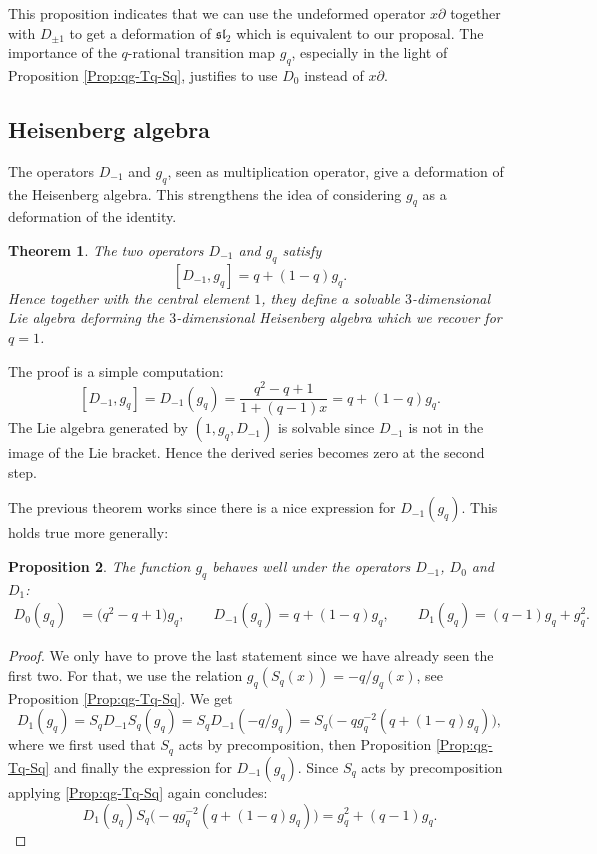 \documentclass[10pt,a4paper]{amsart}
\numberwithin{equation}{section}
\newtheorem{Theorem}{Theorem}[section]
\newtheorem{Proposition}[Theorem]{Proposition}
 { \theoremstyle{definition}
\newtheorem{Definition}[Theorem]{Definition}
\newtheorem{Note}[Theorem]{Note}
\newtheorem{Example}[Theorem]{Example}
\newtheorem{Remark}[Theorem]{Remark} }
\begin{document}
This proposition indicates that we can use the undeformed operator $x\partial$ together with $D_{\pm 1}$ to get a deformation of $\mathfrak{sl}_2$ which is equivalent to our proposal. The importance of the $q$-rational transition map $g_q$, especially in the light of Proposition \ref{Prop:qg-Tq-Sq}, justifies to use $D_0$ instead of $x\partial$.


\subsection{Heisenberg algebra}
The operators $D_{-1}$ and $g_q$, seen as multiplication operator, give a deformation of the Heisenberg algebra. This strengthens the idea of considering $g_q$ as a deformation of the identity.

\begin{Theorem}
The two operators $D_{-1}$ and $g_q$ satisfy
\[
[D_{-1},g_q]=q+(1-q)g_q.
\]
Hence together with the central element $1$, they define a solvable $3$-dimensional Lie algebra deforming the $3$-dimensional Heisenberg algebra which we recover for $q=1$.
\end{Theorem}

The proof is a simple computation:
\[[D_{-1},g_q]=D_{-1}(g_q)=\frac{q^2-q+1}{1+(q-1)x}=q+(1-q)g_q.
\]
The Lie algebra generated by $(1,g_q,D_{-1})$ is solvable since $D_{-1}$ is not in the image of the Lie bracket. Hence the derived series becomes zero at the second step.

The previous theorem works since there is a nice expression for $D_{-1}(g_q)$. This holds true more generally:
\begin{Proposition}\label{Prop:op-diff-gq}
The function $g_q$ behaves well under the operators $D_{-1}$, $D_0$ and $D_1$:
\begin{align*}
D_0(g_q) &= \big(q^2-q+1\big)g_q, \qquad
D_{-1}(g_q) = q+(1-q)g_q, \qquad
D_1(g_q) = (q-1)g_q+g_q^2.
\end{align*}
\end{Proposition}
\begin{proof}
We only have to prove the last statement since we have already seen the first two. For that, we use the relation $g_q(S_q(x))=-q/g_q(x)$, see Proposition \ref{Prop:qg-Tq-Sq}. We get
\[
D_1(g_q)=S_qD_{-1}S_q(g_q)=S_qD_{-1}(-q/g_q)=S_q\bigl(-qg_q^{-2}(q+(1-q)g_q)\bigr),
\]
where we first used that $S_q$ acts by precomposition, then Proposition \ref{Prop:qg-Tq-Sq} and finally the expression for $D_{-1}(g_q)$. Since $S_q$ acts by precomposition applying \ref{Prop:qg-Tq-Sq} again concludes:
\[
D_1(g_q)S_q\bigl(-qg_q^{-2}(q+(1-q)g_q)\bigr)=g_q^2+(q-1)g_q.\tag*{\qed}
\]\renewcommand{\qed}{}
\end{proof}
\end{document}
